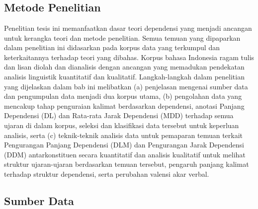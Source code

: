 \chapter{\babTiga} \label{chap:metode_penelitian}

\section{Metode Penelitian}
Penelitian tesis ini memanfaatkan dasar teori dependensi yang menjadi ancangan untuk kerangka teori dan metode penelitian. Semua temuan yang dipaparkan dalam penelitian ini didasarkan pada korpus data yang terkumpul dan keterkaitannya terhadap teori yang dibahas. Korpus bahasa Indonesia ragam tulis dan lisan diolah dan dianalisis dengan ancangan yang memadukan pendekatan analisis linguistik kuantitatif dan kualitatif. Langkah-langkah dalam penelitian yang dijelaskan dalam bab ini melibatkan (a) penjelasan mengenai sumber data dan pengumpulan data menjadi dua korpus utama, (b) pengolahan data yang mencakup tahap penguraian kalimat berdasarkan dependensi, anotasi Panjang Dependensi (DL) dan Rata-rata Jarak Dependensi (MDD) terhadap semua ujaran di dalam korpus, seleksi dan klasifikasi data tersebut untuk keperluan analisis, serta (c) teknik-teknik analisis data untuk pemaparan temuan terkait Pengurangan Panjang Dependensi (DLM) dan Pengurangan Jarak Dependensi (DDM) antarkonstituen secara kuantitatif dan analisis kualitatif untuk melihat struktur ujaran-ujaran berdasarkan temuan tersebut, pengaruh panjang kalimat terhadap struktur dependensi, serta perubahan valensi akar verbal.

\section{Sumber Data}

